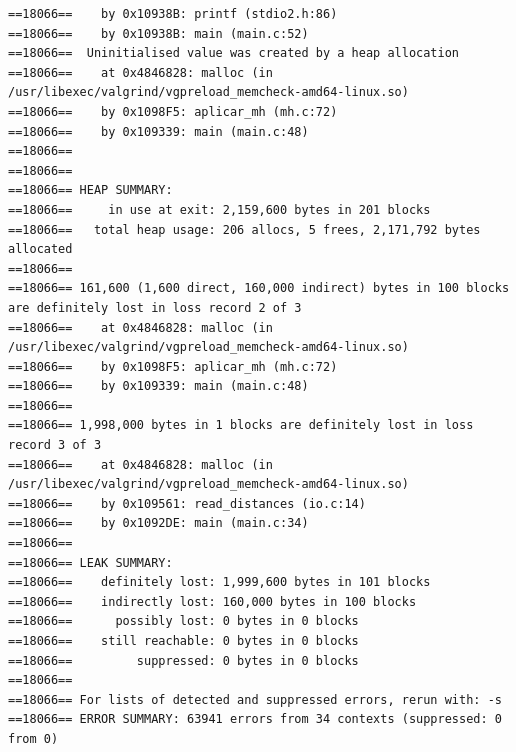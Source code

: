 \documentclass[12pt]{article}
\begin{document}
\begin{lstlisting}[style=EstiloValgrind]
==18066==    by 0x10938B: printf (stdio2.h:86)
==18066==    by 0x10938B: main (main.c:52)
==18066==  Uninitialised value was created by a heap allocation
==18066==    at 0x4846828: malloc (in /usr/libexec/valgrind/vgpreload_memcheck-amd64-linux.so)
==18066==    by 0x1098F5: aplicar_mh (mh.c:72)
==18066==    by 0x109339: main (main.c:48)
==18066== 
==18066== 
==18066== HEAP SUMMARY:
==18066==     in use at exit: 2,159,600 bytes in 201 blocks
==18066==   total heap usage: 206 allocs, 5 frees, 2,171,792 bytes allocated
==18066== 
==18066== 161,600 (1,600 direct, 160,000 indirect) bytes in 100 blocks are definitely lost in loss record 2 of 3
==18066==    at 0x4846828: malloc (in /usr/libexec/valgrind/vgpreload_memcheck-amd64-linux.so)
==18066==    by 0x1098F5: aplicar_mh (mh.c:72)
==18066==    by 0x109339: main (main.c:48)
==18066== 
==18066== 1,998,000 bytes in 1 blocks are definitely lost in loss record 3 of 3
==18066==    at 0x4846828: malloc (in /usr/libexec/valgrind/vgpreload_memcheck-amd64-linux.so)
==18066==    by 0x109561: read_distances (io.c:14)
==18066==    by 0x1092DE: main (main.c:34)
==18066== 
==18066== LEAK SUMMARY:
==18066==    definitely lost: 1,999,600 bytes in 101 blocks
==18066==    indirectly lost: 160,000 bytes in 100 blocks
==18066==      possibly lost: 0 bytes in 0 blocks
==18066==    still reachable: 0 bytes in 0 blocks
==18066==         suppressed: 0 bytes in 0 blocks
==18066== 
==18066== For lists of detected and suppressed errors, rerun with: -s
==18066== ERROR SUMMARY: 63941 errors from 34 contexts (suppressed: 0 from 0)
\end{lstlisting}
\end{document}
